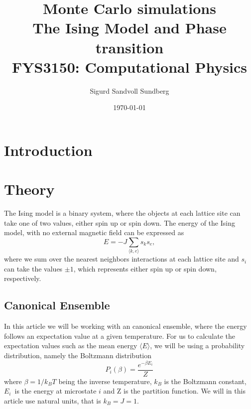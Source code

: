 \documentclass[%
reprint,
nofootinbib,
amsmath,amssymb,
aps,
]{revtex4-1}
\begin{document}
	
\title{Monte Carlo simulations\\
	\normalsize{The Ising Model and Phase transition} \\
	\hrulefill\small{ FYS3150: Computational Physics }\hrulefill}

\author{Sigurd Sandvoll Sundberg}

%

\date{\today}

\begin{abstract}%

\end{abstract}

\maketitle 

\section{Introduction} %

\section{Theory} %
The Ising model is a binary system, where the objects at each lattice site can take one of two values, either spin up or spin down. 
The energy of the Ising model, with no external magnetic field can be expressed as 
\begin{equation}
	E = -J\sum_{\langle k,e \rangle} s_ks_e,
\end{equation}
where we sum over the nearest neighbors interactions at each lattice site and $s_i$ can take the values $\pm 1$, which represents either spin up or spin down, respectively. 

\subsection{Canonical Ensemble} %
In this article we will be working with an canonical ensemble, where the energy follows an expectation value at a given temperature. For us to calculate the expectation values such as the mean energy $\langle E \rangle$, we will be using a probability distribution, namely the Boltzmann distribution
\begin{equation}
	P_i(\beta) = \frac{e^{-\beta E_i}}{Z}
\end{equation}
where $\beta = 1/k_BT$ being the inverse temperature, $k_B$ is the Boltzmann constant, $E_i$ is the energy at microstate $i$ and Z is the partition function. We will in this article use natural units, that is $k_B = J = 1$. 
\end{document}
